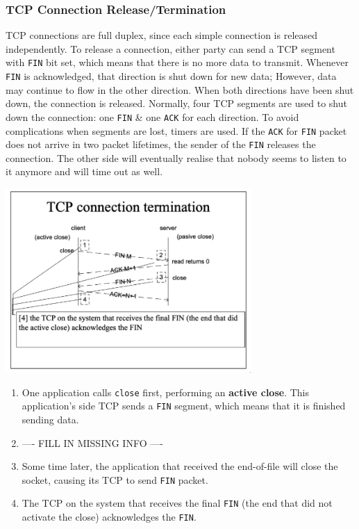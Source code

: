 \documentclass[11pt]{article}
\begin{document}
\subsubsection{TCP Connection Release/Termination}
TCP connections are full duplex, since each simple connection is released independently. 
To release a connection, either party can send a TCP segment with \verb|FIN| bit set, which means that 
there is no more data to transmit.
Whenever \verb|FIN| is acknowledged, that direction is shut down for new data; However, data may continue 
to flow in the other direction.
When both directions have been shut down, the connection is released.
Normally, four TCP segments are used to shut down the connection: one \verb|FIN| \& one \verb|ACK| for each 
direction.
To avoid complications when segments are lost, timers are used. 
If the \verb|ACK| for \verb|FIN| packet does not arrive in two packet lifetimes, the sender of the \verb|FIN| 
releases the connection.
The other side will eventually realise that nobody seems to listen to it anymore and will time out as well.

\begin{center}
    \includegraphics[width=0.7\textwidth]{tcpconnectiontermination.png}
\end{center}
\begin{enumerate}
    \item   One application calls \verb|close| first, performing an \textbf{active close}. 
            This application's side TCP sends a \verb|FIN| segment, which means that it is finished sending data.
    \item   ---- FILL IN MISSING INFO ----
    \item   Some time later, the application that received the end-of-file will close the socket, causing 
            its TCP to send \verb|FIN| packet.
    \item   The TCP on the system that receives the final \verb|FIN| (the end that did not activate the close) 
            acknowledges the \verb|FIN|.
\end{enumerate}
\end{document}
